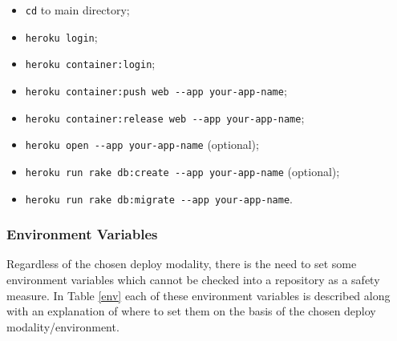 \documentclass[a4paper, english]{article}
\newcounter{subsubsubsection}[subsubsection]
\begin{document}

\begin{itemize}
\item \verb|cd| to main directory;
\item \verb|heroku login|;
\item \verb|heroku container:login|;
\item \verb|heroku container:push web --app your-app-name|;
\item \verb|heroku container:release web --app your-app-name|;
\item \verb|heroku open --app your-app-name| (optional);
\item \verb|heroku run rake db:create --app your-app-name| (optional);
\item \verb|heroku run rake db:migrate --app your-app-name|.
\end{itemize}

\subsubsection{Environment Variables}

Regardless of the chosen deploy modality, there is the need to set some environment variables which cannot be checked into a repository as a safety measure. In Table \ref{env} each of these environment variables is described along with an explanation of where to set them on the basis of the chosen deploy modality/environment. 
\end{document}
